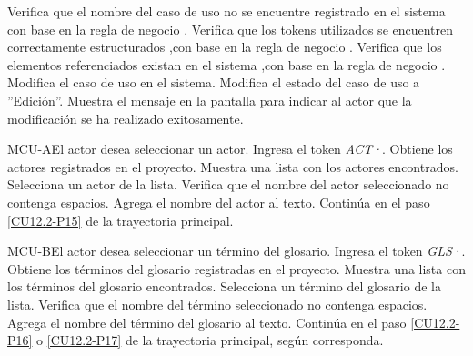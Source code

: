 \begin{UCtrayectoria}
		\UCpaso[\UCsist] Verifica que el nombre del caso de uso no se encuentre registrado en el sistema con base en la regla de negocio . 
		\UCpaso[\UCsist] Verifica que los tokens utilizados se encuentren correctamente estructurados ,con base en la regla de negocio . 
		\UCpaso[\UCsist] Verifica que los elementos referenciados existan en el sistema ,con base en la regla de negocio . 
		\UCpaso[\UCsist] Modifica el caso de uso en el sistema.
		\UCpaso[\UCsist] Modifica el estado del caso de uso a ''Edición''.
		\UCpaso[\UCsist] Muestra el mensaje  en la pantalla  para indicar al actor que la modificación se ha realizado exitosamente.
	\end{UCtrayectoria}		
	
	\begin{UCtrayectoriaA}{MCU-A}{El actor desea seleccionar un actor.}
		\UCpaso[\UCactor] Ingresa el token {\em ACT·}.
		\UCpaso[\UCsist] Obtiene los actores registrados en el proyecto. 
		\UCpaso[\UCsist] Muestra una lista con los actores encontrados.
		\UCpaso[\UCactor] Selecciona un actor de la lista.
		\UCpaso[\UCsist] Verifica que el nombre del actor seleccionado no contenga espacios. 
		\UCpaso[\UCsist] Agrega el nombre del actor al texto.
		\UCpaso Continúa en el paso \ref{CU12.2-P15} de la trayectoria principal.
	\end{UCtrayectoriaA}

	\begin{UCtrayectoriaA}{MCU-B}{El actor desea seleccionar un término del glosario.}
		\UCpaso[\UCactor] Ingresa el token {\em GLS·}.
		\UCpaso[\UCsist] Obtiene los términos del glosario registradas en el proyecto. 
		\UCpaso[\UCsist] Muestra una lista con los términos del glosario encontrados.
		\UCpaso[\UCactor] Selecciona un término del glosario de la lista.
		\UCpaso[\UCsist] Verifica que el nombre del término seleccionado no contenga espacios. 
		\UCpaso[\UCsist] Agrega el nombre del término del glosario al texto.
		\UCpaso Continúa en el paso \ref{CU12.2-P16} o \ref{CU12.2-P17} de la trayectoria principal, según corresponda.
	\end{UCtrayectoriaA}

